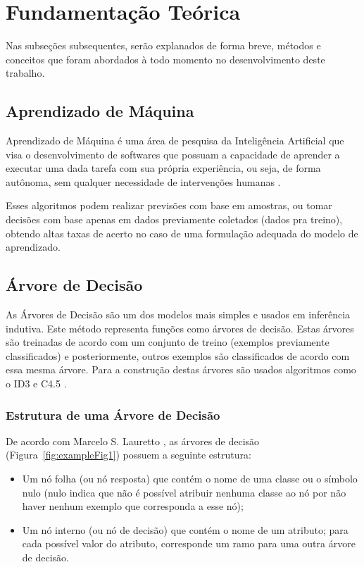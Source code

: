\documentclass[12pt]{article}
\begin{document}
\section{Fundamentação Teórica} 

Nas subseções subsequentes, serão explanados de forma breve, métodos e conceitos que foram abordados à todo momento no desenvolvimento deste trabalho.

\subsection{Aprendizado de Máquina}

Aprendizado de Máquina é uma área de pesquisa da Inteligência Artificial que visa o desenvolvimento de softwares que possuam a capacidade de aprender a executar uma dada tarefa com sua própria experiência, ou seja, de forma autônoma, sem qualquer necessidade de intervenções humanas \cite{Cerri:06}.

Esses algoritmos podem realizar previsões com base em amostras, ou tomar decisões com base apenas em dados previamente coletados (dados pra treino), obtendo altas taxas de acerto no caso de uma formulação adequada do modelo de aprendizado.

\subsection{Árvore de Decisão}

As Árvores de Decisão são um dos modelos mais simples e usados em inferência indutiva. Este método representa funções como árvores de decisão. Estas árvores são treinadas de acordo com um conjunto de treino (exemplos previamente classificados) e posteriormente, outros exemplos são classificados de acordo com essa mesma árvore. Para a construção destas árvores são usados algoritmos como o ID3 \cite{ID3} e C4.5 \cite{C45}.

\subsubsection{Estrutura de uma Árvore de Decisão}

De acordo com Marcelo S. Lauretto \cite{Lauretto:06}, as árvores de decisão (Figura~\ref{fig:exampleFig1}) possuem a seguinte estrutura:

\begin{itemize}
    \item Um nó folha (ou nó resposta) que contém o nome de uma classe ou o símbolo nulo (nulo indica que não é possível atribuir nenhuma classe ao nó por não haver nenhum exemplo que corresponda a esse nó);
    \item Um nó interno (ou nó de decisão) que contém o nome de um atributo; para cada possível valor do atributo, corresponde um ramo para uma outra árvore de decisão.
\end{itemize}
\end{document}
